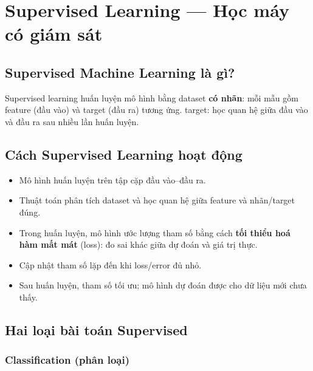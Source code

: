 \section{Supervised Learning --- Học máy có giám sát}
\label{sec:supervised-learning}

\subsection{Supervised Machine Learning là gì?}

\begin{dinhnghia}[title={Học có giám sát}]
Supervised learning huấn luyện mô hình bằng dataset \textbf{có nhãn}: mỗi mẫu gồm feature (đầu vào) và target (đầu ra) tương ứng.
target: học quan hệ giữa đầu vào và đầu ra sau nhiều lần huấn luyện.
\end{dinhnghia}

\subsection{Cách Supervised Learning hoạt động}

\begin{phuongphap}[title={Quy trình huấn luyện}]
\begin{itemize}
  \item Mô hình huấn luyện trên tập cặp đầu vào--đầu ra.
  \item Thuật toán phân tích dataset và học quan hệ giữa feature và nhãn/target đúng.
  \item Trong huấn luyện, mô hình ước lượng tham số bằng cách \textbf{tối thiểu hoá hàm mất mát} (loss): đo sai khác giữa dự đoán và giá trị thực.
  \item Cập nhật tham số lặp đến khi loss/error đủ nhỏ.
  \item Sau huấn luyện, tham số tối ưu; mô hình dự đoán được cho dữ liệu mới chưa thấy.
\end{itemize}
\end{phuongphap}

\subsection{Hai loại bài toán Supervised}

\subsubsection{Classification (phân loại)}

